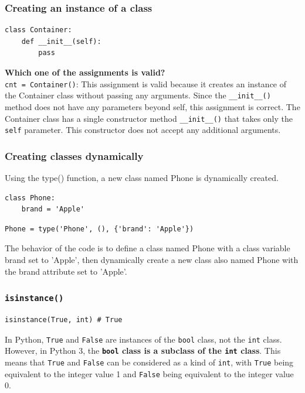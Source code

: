 \subsubsection{Creating an instance of a class}
\begin{codebox}
\begin{verbatim}
class Container:
    def __init__(self):
        pass
\end{verbatim}
\end{codebox}
\textbf{Which one of the assignments is valid?}\\
\texttt{cnt = Container()}: This assignment is valid because it creates an instance of the Container class without passing any arguments. Since the \texttt{\_\_init\_\_()} method does not have any parameters beyond self, this assignment is correct. The Container class has a single constructor method \texttt{\_\_init\_\_()} that takes only the \texttt{self} parameter. This constructor does not accept any additional arguments.

\subsubsection{Creating classes dynamically}
Using the type() function, a new class named Phone is dynamically created.

\begin{codebox}
\begin{verbatim}
class Phone:
    brand = 'Apple'
\end{verbatim}
\end{codebox}

\begin{codebox}
\begin{verbatim}
Phone = type('Phone', (), {'brand': 'Apple'})
\end{verbatim}
\end{codebox}
The behavior of the code is to define a class named Phone with a class variable brand set to 'Apple', then dynamically create a new class also named Phone with the brand attribute set to 'Apple'.

\subsubsection{\texttt{isinstance()}}
\begin{codebox}
\begin{verbatim}
isinstance(True, int) # True
\end{verbatim}
\end{codebox}
In Python, \texttt{True} and \texttt{False} are instances of the \texttt{bool} class, not the \texttt{int} class. However, in Python 3, the \textbf{\texttt{bool} class is a subclass of the \texttt{int} class}. This means that \texttt{True} and \texttt{False} can be considered as a kind of \texttt{int}, with \texttt{True} being equivalent to the integer value 1 and \texttt{False} being equivalent to the integer value 0.


